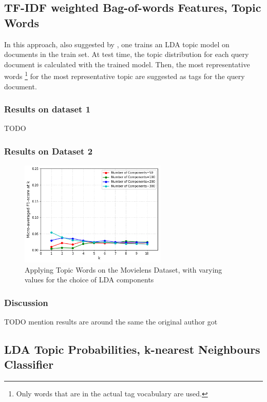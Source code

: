 \subsection{TF-IDF weighted Bag-of-words Features, Topic Words}

In this approach, also suggested by \cite{choubey_2011}, one trains an LDA topic model on documents in the train set. At test time, the topic distribution for each query document is calculated with the trained model. Then, the most representative words \footnote{Only words that are in the actual tag vocabulary are used.} for the most representative topic are suggested as tags for the query document.

\subsubsection{Results on dataset 1}

{\color{red} TODO}

\subsubsection{Results on Dataset 2}

\begin{figure}[H]
    \centering
    \includegraphics[width=7cm]{chapters/05_experiments/images/movielens-topic-words.png}
    \caption{Applying Topic Words on the Movielens Dataset, with varying values for the choice of LDA components}
    \label{fig:ovr_svm_movielens}
\end{figure}

\subsubsection{Discussion}

{\color{red} TODO mention results are around the same the original author got}

\subsection{LDA Topic Probabilities, k-nearest Neighbours Classifier}\label{sub:lda_topics}

